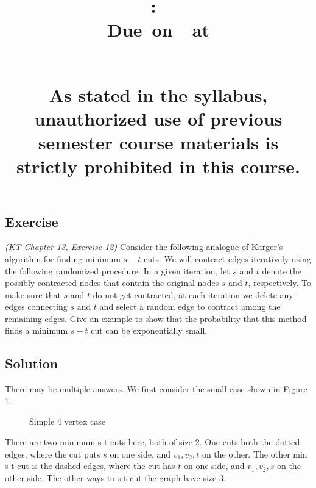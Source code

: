 \documentclass{article}
\title{
    \vspace{2in}
    \textbf{\hmwkClass:\ \hmwkTitle}\\
    \normalsize\vspace{0.1in}\small{Due\ on\ \hmwkDueDate\ at \hmwkDueTime}\\
    \vspace{0.1in}\large{\textit{\hmwkClassInstructor\ \hmwkSection}} \\
    \vspace{0.8in}
    \begin{minipage}[t]{0.4\columnwidth}
        {\footnotesize\textbf{As stated in the syllabus, unauthorized use of previous semester course materials is strictly prohibited in this course.
        }}
    \vspace{0.5in}
    \end{minipage}
    \vspace{0.8in}
    \author{\textbf{\hmwkAuthorName}}
    \date{}
}
\newcounter{counter}
\newcommand{\Exercise}{Exercise \stepcounter{counter}\thecounter}
\begin{document}
\maketitle
\pagebreak

\subsection*{\Exercise}
    \textit{(KT Chapter 13, Exercise 12)}  Consider the following analogue of Karger's
    algorithm for finding minimum $s-t$ cuts.  We will contract edges
    iteratively using the following randomized procedure.  In a given iteration,
    let $s$ and $t$ denote the possibly contracted nodes that contain the
    original nodes $s$ and $t$, respectively.  To make sure that $s$ and $t$ do
    not get contracted, at each iteration we delete any edges connecting $s$ and
    $t$ and select a random edge to contract among the remaining edges.  Give an
    example to show that the probability that this method finds a minimum $s-t$
    cut can be exponentially small.
    
\subsection*{Solution}
    There may be multiple answers. We first consider the small case shown in Figure 1.
    \begin{figure}[H]
      \begin{center}
      \end{center}
      \vspace{-6mm}
      \caption{Simple 4 vertex case}
    \end{figure}
    There are two minimum s-t cuts here, both of size $2$. One cuts both the dotted edges, where the cut puts $s$ on one side, and $v_1, v_2, t$ on the other. The other min s-t cut is the dashed edges, where the cut has $t$ on one side, and $v_1, v_2, s$ on the other side. The other ways to s-t cut the graph have size $3$.
\end{document}
